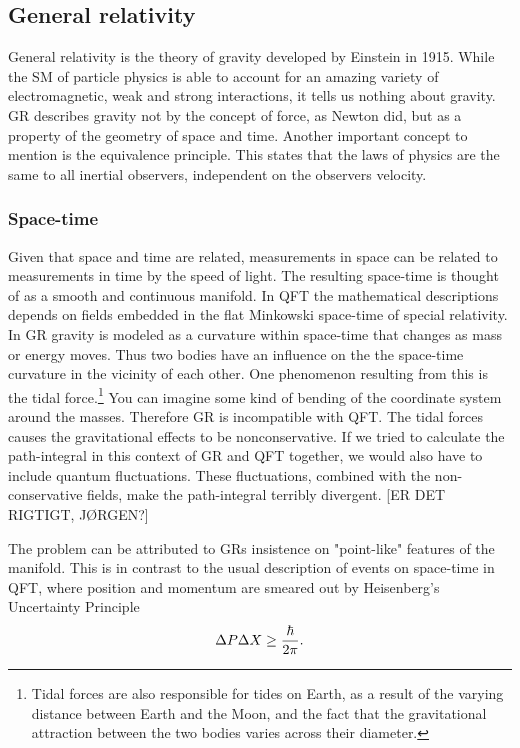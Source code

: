 \subsection{General relativity}
General relativity is the theory of gravity developed by Einstein in 1915. While the SM of particle physics is able to account for an amazing variety of electromagnetic, weak and strong interactions, it tells us nothing about gravity. GR describes gravity not by the concept of force, as Newton did, but as a property of the geometry of space and time. Another important concept to mention is the equivalence principle. This states that the laws of physics are the same to all inertial observers, independent on the observers velocity.

\subsubsection{Space-time}
Given that space and time are related, measurements in space can be related to measurements in time by the speed of light. The resulting space-time is thought of as a smooth and continuous manifold. In QFT the mathematical descriptions depends on fields embedded in the flat Minkowski space-time of special relativity. In GR gravity is modeled as a curvature within space-time that changes as mass or energy moves. Thus two bodies have an influence on the the space-time curvature in the vicinity of each other. One phenomenon resulting from this is the tidal force.\footnote{Tidal forces are also responsible for tides on Earth, as a result of the varying distance between Earth and the Moon, and the fact that the gravitational attraction between the two bodies varies across their diameter.} You can imagine some kind of bending of the coordinate system around the masses. Therefore GR is incompatible with QFT. The tidal forces causes the gravitational effects to be nonconservative. If we tried to calculate the path-integral in this context of GR and QFT together, we would also have to include quantum fluctuations. These fluctuations, combined with the non-conservative fields, make the path-integral terribly divergent. [ER DET RIGTIGT, JØRGEN?]

The problem can be attributed to GRs insistence on "point-like" features of the manifold. This is in contrast to the usual description of events on space-time in QFT, where position and momentum are smeared out by Heisenberg's Uncertainty Principle
\begin{equation}
	\Delta P \Delta X \geq {\hbar \over 2 \pi}.
\end{equation}

